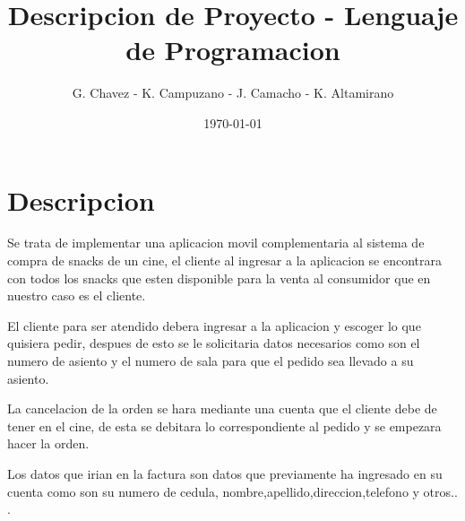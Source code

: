 \documentclass{beamer}
\title{Descripcion de Proyecto -  Lenguaje de Programacion}
\author{G. Chavez - K. Campuzano - J. Camacho - K. Altamirano}
\date{\today}
\begin{document}
\frame{\titlepage}

\section[Indice]{}
\begin{frame}[allowframebreaks]
\tableofcontents
\end{frame}

\section{Descripcion}

  \begin{frame}
   Se trata de implementar una aplicacion movil complementaria al sistema de compra de snacks de un cine, el cliente al ingresar a la aplicacion se encontrara con todos los snacks que esten disponible para la venta al consumidor que en nuestro caso es el cliente.

El cliente para ser atendido debera ingresar a la aplicacion y escoger lo que quisiera pedir, despues de esto se le solicitaria datos necesarios como son el numero de asiento y el numero de sala para que el pedido sea llevado a su asiento.

La cancelacion de la orden se hara mediante una cuenta que el cliente debe de tener en el cine, de esta se debitara lo correspondiente al pedido y se empezara hacer la orden.

Los datos que irian en la factura son datos que previamente ha ingresado en su cuenta como son su numero de cedula, nombre,apellido,direccion,telefono y otros.. .

  \end{frame}
\end{document}
